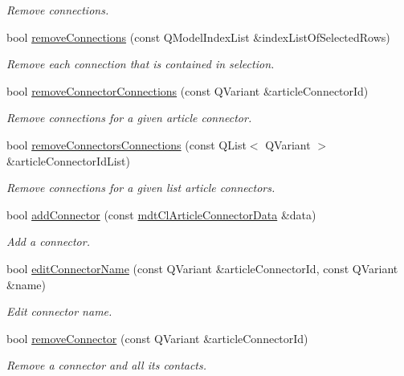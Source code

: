 \begin{DoxyCompactItemize}
\begin{DoxyCompactList}\small\item\em Remove connections. \end{DoxyCompactList}\item 
bool \hyperlink{classmdt_cl_article_af81c77766eafe0cbd88c7f00f4ec4928}{remove\-Connections} (const Q\-Model\-Index\-List \&index\-List\-Of\-Selected\-Rows)
\begin{DoxyCompactList}\small\item\em Remove each connection that is contained in selection. \end{DoxyCompactList}\item 
bool \hyperlink{classmdt_cl_article_ac9704a413087d1d0e8f2dd51c33bd74e}{remove\-Connector\-Connections} (const Q\-Variant \&article\-Connector\-Id)
\begin{DoxyCompactList}\small\item\em Remove connections for a given article connector. \end{DoxyCompactList}\item 
bool \hyperlink{classmdt_cl_article_af9e67178a6028549a1b8167efafe6544}{remove\-Connectors\-Connections} (const Q\-List$<$ Q\-Variant $>$ \&article\-Connector\-Id\-List)
\begin{DoxyCompactList}\small\item\em Remove connections for a given list article connectors. \end{DoxyCompactList}\item 
bool \hyperlink{classmdt_cl_article_a2e30c08621a8cc73bc4f6c041189f9ab}{add\-Connector} (const \hyperlink{classmdt_cl_article_connector_data}{mdt\-Cl\-Article\-Connector\-Data} \&data)
\begin{DoxyCompactList}\small\item\em Add a connector. \end{DoxyCompactList}\item 
bool \hyperlink{classmdt_cl_article_aed8a2fc638636a618409694a655e9819}{edit\-Connector\-Name} (const Q\-Variant \&article\-Connector\-Id, const Q\-Variant \&name)
\begin{DoxyCompactList}\small\item\em Edit connector name. \end{DoxyCompactList}\item 
bool \hyperlink{classmdt_cl_article_aa675a24b08929b5efb4c421176b8bdde}{remove\-Connector} (const Q\-Variant \&article\-Connector\-Id)
\begin{DoxyCompactList}\small\item\em Remove a connector and all its contacts. \end{DoxyCompactList}\item 

\end{DoxyCompactItemize}
